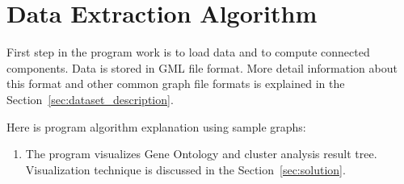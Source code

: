 \section{Data Extraction Algorithm}
\label{sec:algorithm}
First step in the program work is to load data and to compute connected components. Data is stored in GML file format. More detail information about this format and other common graph file formats is explained in the Section~\ref{sec:dataset_description}.

Here is program algorithm explanation using sample graphs:
\begin{enumerate}

\item The program visualizes Gene Ontology and cluster analysis result tree. Visualization technique is discussed in the Section~\ref{sec:solution}.


\end{enumerate}

